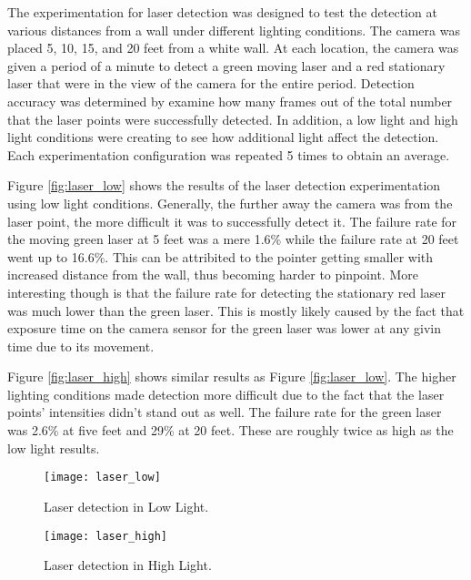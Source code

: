 \documentclass[10pt,twocolumn,letterpaper]{article}
\begin{document}
The experimentation for laser detection was designed to test the detection at various distances from a wall under different lighting conditions. The camera was placed 5, 10, 15, and 20 feet from a white wall. At each location, the camera was given a period of a minute to detect a green moving laser and a red stationary laser that were in the view of the camera for the entire period. Detection accuracy was determined by examine how many frames out of the total number that the laser points were successfully detected. In addition, a low light and high light conditions were creating to see how additional light affect the detection. Each experimentation configuration was repeated 5 times to obtain an average.

Figure \ref{fig:laser_low} shows the results of the laser detection experimentation using low light conditions. Generally, the further away the camera was from the laser point, the more difficult it was to successfully detect it. The failure rate for the moving green laser at 5 feet was a mere 1.6\% while the failure rate at 20 feet went up to 16.6\%. This can be attribited to the pointer getting smaller with increased distance from the wall, thus becoming harder to pinpoint. More interesting though is that the failure rate for detecting the stationary red laser was much lower than the green laser. This is mostly likely caused by the fact that exposure time on the camera sensor for the green laser was lower at any givin time due to its movement.  

Figure \ref{fig:laser_high} shows similar results as Figure \ref{fig:laser_low}. The higher lighting conditions made detection more difficult due to the fact that the laser points' intensities didn't stand out as well. The failure rate for the green laser was 2.6\% at five feet and 29\% at 20 feet. These are roughly twice as high as the low light results.

\begin{figure}[t]
\begin{center}
  \texttt{[image: laser\_low]}
\end{center}
   \caption{Laser detection in Low Light.}
\label{fig:laser_low}
\label{fig:long}
\label{fig:onecol}
\end{figure}

\begin{figure}[t]
\begin{center}
  \texttt{[image: laser\_high]}
\end{center}
   \caption{Laser detection in High Light.}
\label{fig:laser_high}
\label{fig:long}
\label{fig:onecol}
\end{figure}
\end{document}
